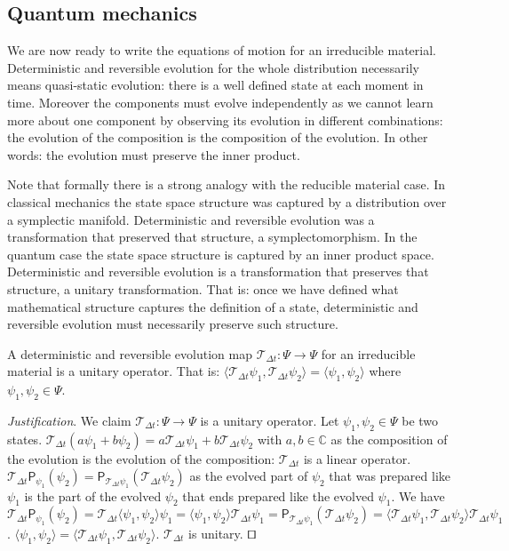 \documentclass[smallextended]{svjour3}
\numberwithin{equation}{section}
\newenvironment{justification}{\emph{Justification}.}{\hfill\(\qed\)}
\begin{document}
\subsection{Quantum mechanics}

We are now ready to write the equations of motion for an irreducible material. Deterministic and reversible evolution for the whole distribution necessarily means quasi-static evolution: there is a well defined state at each moment in time. Moreover the components must evolve independently as we cannot learn more about one component by observing its evolution in different combinations: the evolution of the composition is the composition of the evolution. In other words: the evolution must preserve the inner product.

Note that formally there is a strong analogy with the reducible material case. In classical mechanics the state space structure was captured by a distribution over a symplectic manifold. Deterministic and reversible evolution was a transformation that preserved that structure, a symplectomorphism. In the quantum case the state space structure is captured by an inner product space. Deterministic and reversible evolution is a transformation that preserves that structure, a unitary transformation. That is: once we have defined what mathematical structure captures the definition of a state, deterministic and reversible evolution must necessarily preserve such structure.

\begin{prop}\label{prop:unitary_evolution}
	A deterministic and reversible evolution map $\mathcal{T}_{\Delta t}: \Psi \rightarrow \Psi$ for an irreducible material is a unitary operator. That is: $\langle \mathcal{T}_{\Delta t} \psi_1, \mathcal{T}_{\Delta t} \psi_2 \rangle = \langle \psi_1 , \psi_2 \rangle$ where $\psi_1, \psi_2 \in \Psi$.
\end{prop}

\begin{justification}
	We claim $\mathcal{T}_{\Delta t}: \Psi \rightarrow \Psi$ is a unitary operator. Let $\psi_1, \psi_2 \in \Psi$ be two states. $\mathcal{T}_{\Delta t}(a\psi_1+b\psi_2) = a \mathcal{T}_{\Delta t} \psi_1 + b \mathcal{T}_{\Delta t} \psi_2$ with $a,b \in \mathbb{C}$ as the composition of the evolution is the evolution of the composition: $\mathcal{T}_{\Delta t}$ is a linear operator. $\mathcal{T}_{\Delta t} \mathsf{P}_{\psi_1} (\psi_2) = \mathsf{P}_{\mathcal{T}_{\Delta t}\psi_1} (\mathcal{T}_{\Delta t}\psi_2)$ as the evolved part of $\psi_2$ that was prepared like $\psi_1$ is the part of the evolved $\psi_2$ that ends prepared like the evolved $\psi_1$. We have $\mathcal{T}_{\Delta t} \mathsf{P}_{\psi_1} (\psi_2) = \mathcal{T}_{\Delta t} \langle \psi_1 , \psi_2 \rangle \psi_1 = \langle \psi_1 , \psi_2 \rangle \mathcal{T}_{\Delta t} \psi_1 = \mathsf{P}_{\mathcal{T}_{\Delta t}\psi_1} (\mathcal{T}_{\Delta t}\psi_2) = \langle \mathcal{T}_{\Delta t}\psi_1 , \mathcal{T}_{\Delta t}\psi_2 \rangle \mathcal{T}_{\Delta t} \psi_1$. $\langle \psi_1 , \psi_2 \rangle = \langle \mathcal{T}_{\Delta t}\psi_1 , \mathcal{T}_{\Delta t}\psi_2 \rangle$. $\mathcal{T}_{\Delta t}$ is unitary.
\end{justification}
	
\end{document}
